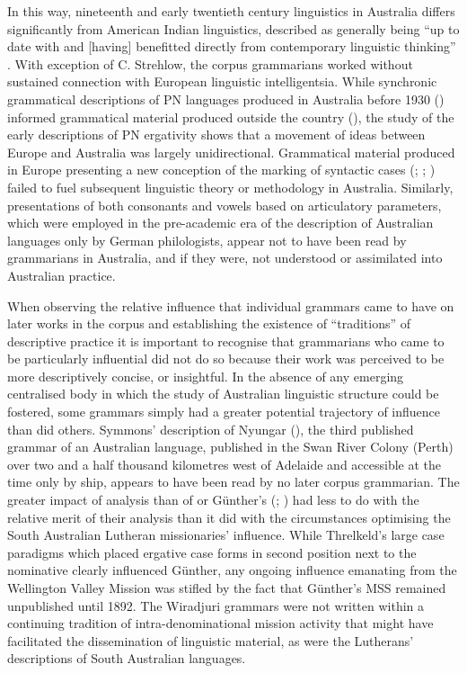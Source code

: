 In this way, nineteenth and early twentieth century linguistics in Australia differs significantly from American Indian linguistics, described as generally being “up to date with and [having] benefitted directly from contemporary linguistic thinking” \citep[28]{campbell_american_1997}. With exception of C. Strehlow, the corpus grammarians worked without sustained connection with European linguistic intelligentsia. While synchronic grammatical descriptions of PN languages produced in Australia before 1930 () informed grammatical material produced outside the country (), the study of the early descriptions of PN ergativity shows that a movement of ideas between Europe and Australia was largely unidirectional. Grammatical material produced in Europe presenting a new conception of the marking of syntactic cases (\citealt{muller_grundris_1882}; \citealt{planert_australische_1907}; \citealt{planert_australische_1908}) failed to fuel subsequent linguistic theory or methodology in Australia. Similarly, presentations of both consonants and vowels based on articulatory parameters, which were employed in the pre-academic era of the description of Australian languages only by German philologists, appear not to have been read by grammarians in Australia, and if they were, not understood or assimilated into Australian practice.

When observing the relative influence that individual grammars came to have on later works in the corpus and establishing the existence of “traditions” of descriptive practice it is important to recognise that grammarians who came to be particularly influential did not do so because their work was perceived to be more descriptively concise, or insightful. In the absence of any emerging centralised body in which the study of Australian linguistic structure could be fostered, some grammars simply had a greater potential trajectory of influence than did others. Symmons' description of Nyungar (\citeyear{symmons_grammatical_1841}), the third published grammar of an Australian language, published in the Swan River Colony (Perth) over two and a half thousand kilometres west of Adelaide and accessible at the time only by ship, appears to have been read by no later corpus grammarian. The greater impact of \citet{teichelmann_outlines_1840} analysis than of  or Günther’s (\citeyear{gunther_native_1838}; \citeyear{gunther_lecture_1840}) had less to do with the relative merit of their analysis than it did with the circumstances optimising the South Australian Lutheran missionaries' influence. While Threlkeld’s large case paradigms which placed ergative case forms in second position next to the nominative clearly influenced Günther, any ongoing influence emanating from the Wellington Valley Mission was stifled by the fact that Günther’s MSS remained unpublished until 1892. The Wiradjuri grammars were not written within a continuing tradition of intra-denominational mission activity that might have facilitated the dissemination of linguistic material, as were the Lutherans' descriptions of South Australian languages.

